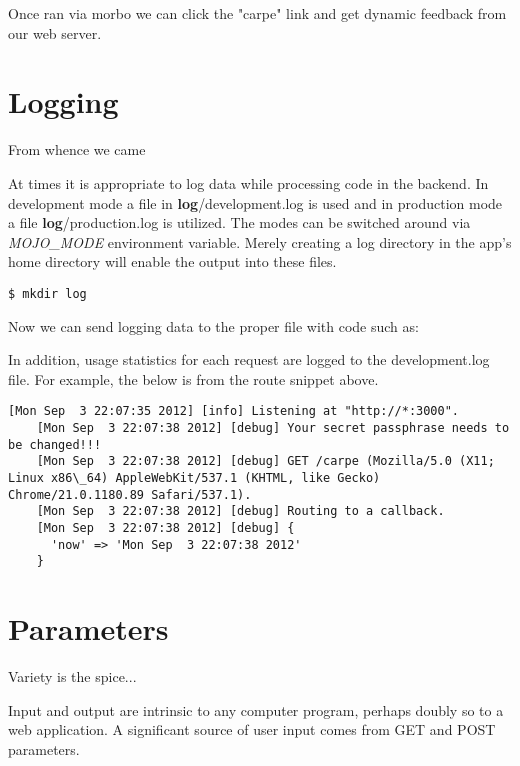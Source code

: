 \documentclass[14pt]{extreport}
\newcommand\Small{\fontsize{12}{13.0}\fontencoding{T1}\selectfont}
\newcommand*\LSTfont{\Small\ttfamily\SetTracking{encoding=*}{-60}\lsstyle}
\begin{document}


Once ran via morbo we can click the "carpe" link and get dynamic feedback from our web server.

\section{Logging}

{\Large From whence we came}

At times it is appropriate to log data while processing code in the backend.
In development mode a file in \textbf{log}/development.log is used and in
production mode a file \textbf{log}/production.log is utilized. The modes can
be switched around via \textit{MOJO\_MODE} environment variable. Merely
creating a log directory in the app's home directory will enable the output
into these files.

\begin{lstlisting}[style=BashInputStyle]
$ mkdir log
\end{lstlisting}

Now we can send logging data to the proper file with code such as:



In addition, usage statistics for each request are logged to the
development.log file.  For example, the below is from the route snippet above.

\begin{lstlisting}[style=BashOutputStyle]
    [Mon Sep  3 22:07:35 2012] [info] Listening at "http://*:3000".
    [Mon Sep  3 22:07:38 2012] [debug] Your secret passphrase needs to be changed!!!
    [Mon Sep  3 22:07:38 2012] [debug] GET /carpe (Mozilla/5.0 (X11; Linux x86\_64) AppleWebKit/537.1 (KHTML, like Gecko) Chrome/21.0.1180.89 Safari/537.1).
    [Mon Sep  3 22:07:38 2012] [debug] Routing to a callback.
    [Mon Sep  3 22:07:38 2012] [debug] {
      'now' => 'Mon Sep  3 22:07:38 2012'
    }
\end{lstlisting}

\section{Parameters}

{\Large Variety is the spice...}

Input and output are intrinsic to any computer program, perhaps doubly so to a
web application.  A significant source of user input comes from GET and POST
parameters.
\end{document}
